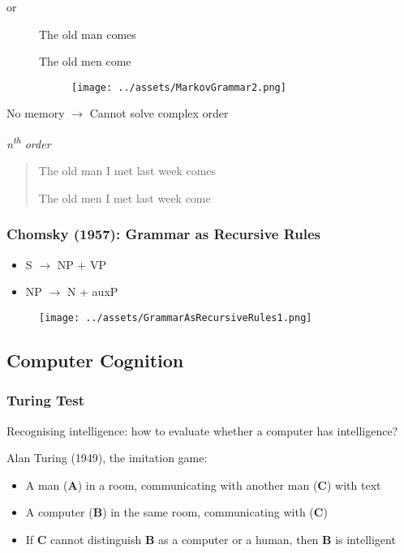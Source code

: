 \documentclass[a4paper, openany]{book}
\begin{document}
or

\begin{figure}[htbp]
  \centering
  \parbox[t]{0.29\textwidth}{The old man comes

    The old men come}
  \begin{subfigure}{0.39\textwidth}
    \raggedright
    \texttt{[image: ../assets/MarkovGrammar2.png]}
  \end{subfigure}
\end{figure}

No memory $\rightarrow$ Cannot solve complex order

\emph{n\textsuperscript{th} order}

\begin{quote}
  The old man I met last week comes

  The old men I met last week come
\end{quote}

\subsubsection{Chomsky (1957): Grammar as Recursive
Rules}

\begin{itemize}
  \item S $\rightarrow$ NP + VP
  \item NP $\rightarrow$ N + auxP
\end{itemize}

\begin{figure}[htbp]
  \centering
  \texttt{[image: ../assets/GrammarAsRecursiveRules1.png]}
\end{figure}

\subsection{Computer Cognition}

\subsubsection{Turing Test}

Recognising intelligence: how to evaluate whether a computer has intelligence?

Alan Turing (1949), the imitation game:

\begin{itemize}
  \item A man (\textbf{A}) in a room, communicating with another man (\textbf{C}) with text
  \item A computer (\textbf{B}) in the same room, communicating with (\textbf{C})
  \item If \textbf{C} cannot distinguish \textbf{B} as a computer or a human, then \textbf{B} is intelligent
\end{itemize}
\end{document}
